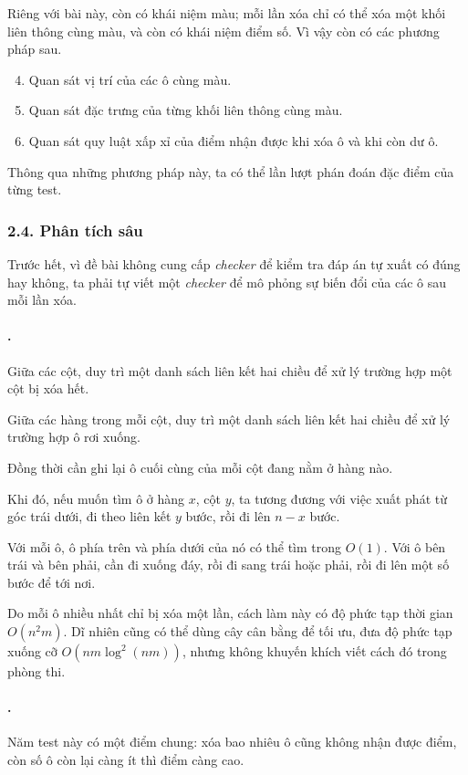 \documentclass[11pt]{article}
\begin{document}
Riêng với bài này, còn có khái niệm màu; mỗi lần xóa chỉ có thể xóa một khối
liên thông cùng màu, và còn có khái niệm điểm số. Vì vậy còn có các phương
pháp sau.

\begin{enumerate}
  \setcounter{enumi}{3}
  \item Quan sát vị trí của các ô cùng màu.
  \item Quan sát đặc trưng của từng khối liên thông cùng màu.
  \item Quan sát quy luật xấp xỉ của điểm nhận được khi xóa ô và khi còn dư ô.
\end{enumerate}

Thông qua những phương pháp này, ta có thể lần lượt phán đoán đặc điểm của
từng test.

\subsubsection*{2.4. Phân tích sâu}

Trước hết, vì đề bài không cung cấp \emph{checker} để kiểm tra đáp án tự xuất
có đúng hay không, ta phải tự viết một \emph{checker} để mô phỏng sự biến đổi
của các ô sau mỗi lần xóa.

\paragraph{.}
Giữa các cột, duy trì một danh sách liên kết hai chiều để xử lý trường hợp
một cột bị xóa hết.

Giữa các hàng trong mỗi cột, duy trì một danh sách liên kết hai chiều để xử lý
trường hợp ô rơi xuống.

Đồng thời cần ghi lại ô cuối cùng của mỗi cột đang nằm ở hàng nào.

Khi đó, nếu muốn tìm ô ở hàng \(x\), cột \(y\), ta tương đương với việc xuất
phát từ góc trái dưới, đi theo liên kết \(y\) bước, rồi đi lên \(n-x\) bước.

Với mỗi ô, ô phía trên và phía dưới của nó có thể tìm trong \(O(1)\). Với ô
bên trái và bên phải, cần đi xuống đáy, rồi đi sang trái hoặc phải, rồi đi lên
một số bước để tới nơi.

Do mỗi ô nhiều nhất chỉ bị xóa một lần, cách làm này có độ phức tạp thời gian
\(O(n^2m)\). Dĩ nhiên cũng có thể dùng cây cân bằng để tối ưu, đưa độ phức tạp
xuống cỡ \(O(nm\log^2(nm))\), nhưng không khuyến khích viết cách đó trong
phòng thi.

\paragraph{.}
Năm test này có một điểm chung: xóa bao nhiêu ô cũng không nhận được điểm, còn
số ô còn lại càng ít thì điểm càng cao.
\end{document}
